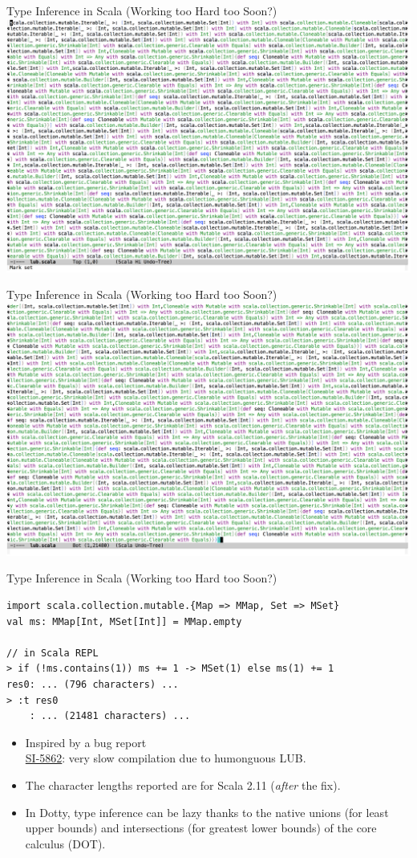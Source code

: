 \documentclass{beamer}
\begin{document}
\begin{frame}[fragile]{Type Inference in Scala (Working too Hard too Soon?)}
\includegraphics[width=\textwidth]{lub1.png}
\end{frame}

\begin{frame}[fragile]{Type Inference in Scala (Working too Hard too Soon?)}
\includegraphics[width=\textwidth]{lub2.png}
\end{frame}

\begin{frame}[fragile]{Type Inference in Scala (Working too Hard too Soon?)}
\begin{verbatim}
import scala.collection.mutable.{Map => MMap, Set => MSet}
val ms: MMap[Int, MSet[Int]] = MMap.empty

// in Scala REPL
> if (!ms.contains(1)) ms += 1 -> MSet(1) else ms(1) += 1
res0: ... (796 characters) ...
> :t res0
    : ... (21481 characters) ...
\end{verbatim}
\begin{itemize}
\item Inspired by a bug report\\
\href{https://issues.scala-lang.org/browse/SI-5862}{SI-5862}: very slow compilation due to humonguous LUB.
\item The character lengths reported are for Scala 2.11 ({\em after} the fix).
\item In Dotty, type inference can be lazy thanks to the native unions (for least upper bounds) and intersections (for greatest lower bounds) of the core calculus (DOT).
\end{itemize}
\end{frame}
\end{document}
